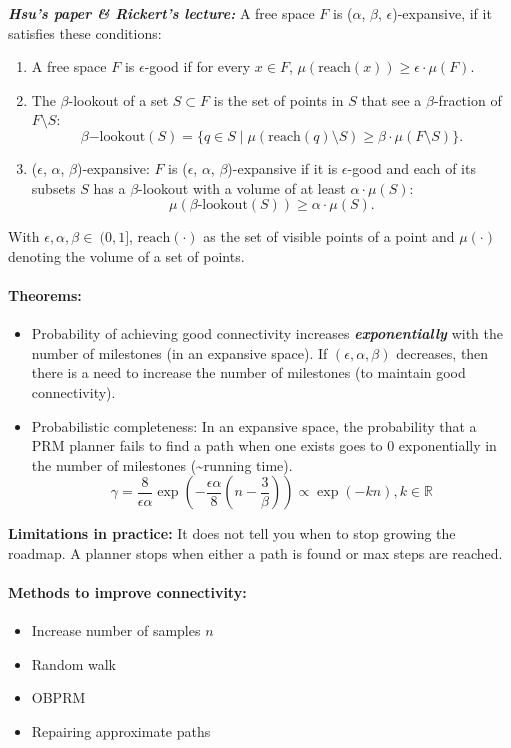 \begin{multicols*}{2}
\textit{\textbf{Hsu's paper \& Rickert's lecture:}} A free space $F$ is ($\alpha$, $\beta$, $\epsilon$)-expansive, if it satisfies these conditions: 
\begin{enumerate}
	\item A free space $F$ is $\epsilon$-good if for every $x \in F$, $\mu (\text{reach}(x)) \geq \epsilon \cdot \mu(F)$.
	\item The $\beta$-lookout of a set $S\subset F$ is the set of points in $S$ that see a $\beta$-fraction of $F \setminus S$:
	\[\beta\mathrm{-lookout}(S) = \{q\in S \; \vert \; \mu(\text{reach}(q) \setminus S) \geq \beta \cdot \mu(F \setminus S)\}. \]
	\item ($\epsilon$, $\alpha$, $\beta$)-expansive: $F$ is ($\epsilon$, $\alpha$, $\beta$)-expansive if it is $\epsilon$-good and each of its 	subsets $S$ has a $\beta$-lookout with a volume of at least $\alpha \cdot \mu(S)$:
	\[\mu(\beta\text{-lookout}(S)) \geq \alpha \cdot \mu(S).\]
\end{enumerate}
With $\epsilon, \alpha, \beta \in \ (0,1]$, $\text{reach}(\cdot)$ as the set of visible points of a point and $\mu(\cdot)$ denoting the volume of a set of points.\par

\paragraph{Theorems:}
\begin{itemize}
	\item Probability of achieving good connectivity increases \textit{\textbf{exponentially}} with the number of milestones (in an expansive space). If $(\epsilon, \alpha, \beta)$ decreases, then there is a need to increase the number of milestones (to maintain good connectivity).
	\item Probabilistic completeness: In an expansive space, the probability that a PRM planner fails to find a path when one exists goes to $0$ exponentially in the number of milestones (\textasciitilde running time).
	\[\gamma = \frac{8}{\epsilon \alpha} \exp\left (- \frac{\epsilon \alpha}{8} \left (n - \frac{3}{\beta}\right )\right ) \propto \exp(-kn), k \in \mathbb{R} \]
\end{itemize}

\textbf{Limitations in practice:} It does not tell you when to stop growing the roadmap. A planner stops when either a path is found or max steps are reached.\par

\paragraph{Methods to improve connectivity:}
\begin{itemize}
	\item Increase number of samples $n$
	\item Random walk
	\item OBPRM
	\item Repairing approximate paths
\end{itemize}


\end{multicols*}
